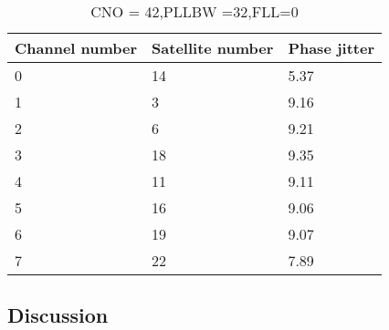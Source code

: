 \begin{table}[!htb]
\centering
\begin{tabular}{|l|l|l|}
\hline
\rowcolor[HTML]{C0C0C0} 
Channel number & Satellite number & Phase jitter       \\ \hline
0              & 14               & 5.37 \\ \hline
\rowcolor[HTML]{EFEFEF} 
1              & 3                & 9.16 \\ \hline
2              & 6                & 9.21 \\ \hline
\rowcolor[HTML]{EFEFEF} 
3              & 18               & 9.35 \\ \hline
4              & 11               & 9.11 \\ \hline
\rowcolor[HTML]{EFEFEF} 
5              & 16               & 9.06 \\ \hline
6              & 19               & 9.07 \\ \hline
\rowcolor[HTML]{EFEFEF} 
7              & 22               & 7.89 \\ \hline
\end{tabular}
\caption{CNO = 42,PLLBW =32,FLL=0}
\label{my-label}
\end{table}

\clearpage
\subsection{Discussion}




